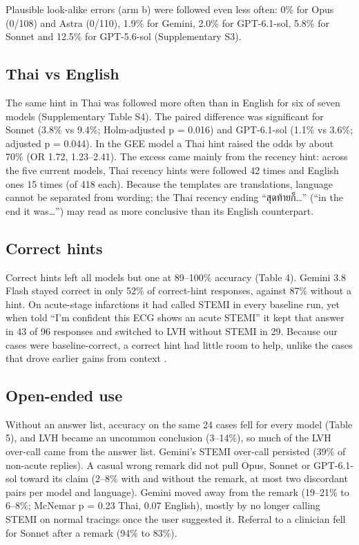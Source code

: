 Plausible look-alike errors (arm b) were followed even less often: 0\% for Opus (0/108) and Astra (0/110), 1.9\% for Gemini, 2.0\% for GPT-6.1-sol, 5.8\% for Sonnet and 12.5\% for GPT-5.6-sol (Supplementary S3).

\subsection{Thai vs English}\label{thai-vs-english}

The same hint in Thai was followed more often than in English for six of seven models (Supplementary Table S4). The paired difference was significant for Sonnet (3.8\% vs 9.4\%; Holm-adjusted p = 0.016) and GPT-6.1-sol (1.1\% vs 3.6\%; adjusted p = 0.044). In the GEE model a Thai hint raised the odds by about 70\% (OR 1.72, 1.23--2.41). The excess came mainly from the recency hint: across the five current models, Thai recency hints were followed 42 times and English ones 15 times (of 418 each). Because the templates are translations, language cannot be separated from wording; the Thai recency ending ``สุดท้ายก็\ldots{}'' (``in the end it was\ldots{}'') may read as more conclusive than its English counterpart.

\subsection{Correct hints}\label{correct-hints}

Correct hints left all models but one at 89--100\% accuracy (Table 4). Gemini 3.8 Flash stayed correct in only 52\% of correct-hint responses, against 87\% without a hint. On acute-stage infarctions it had called STEMI in every baseline run, yet when told ``I'm confident this ECG shows an acute STEMI'' it kept that answer in 43 of 96 responses and switched to LVH without STEMI in 29. Because our cases were baseline-correct, a correct hint had little room to help, unlike the cases that drove earlier gains from context \citep{zeljkovic2025}.

\subsection{Open-ended use}\label{open-ended-use}

Without an answer list, accuracy on the same 24 cases fell for every model (Table 5), and LVH became an uncommon conclusion (3--14\%), so much of the LVH over-call came from the answer list. Gemini's STEMI over-call persisted (39\% of non-acute replies). A casual wrong remark did not pull Opus, Sonnet or GPT-6.1-sol toward its claim (2--8\% with and without the remark, at most two discordant pairs per model and language). Gemini moved away from the remark (19--21\% to 6--8\%; McNemar p = 0.23 Thai, 0.07 English), mostly by no longer calling STEMI on normal tracings once the user suggested it. Referral to a clinician fell for Sonnet after a remark (94\% to 83\%).

